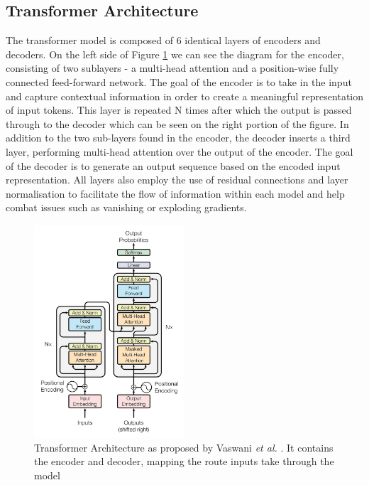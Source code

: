 \subsection{Transformer Architecture}

The transformer model is composed of 6 identical layers of encoders and decoders. On the left side of Figure \ref{fig:transformer_arch} we can see the diagram for the encoder, consisting of two sublayers - a multi-head attention and a position-wise fully connected feed-forward network. The goal of the encoder is to take in the input and capture contextual information in order to create a meaningful representation of input tokens. This layer is repeated N times after which the output is passed through to the decoder which can be seen on the right portion of the figure. In addition to the two sub-layers found in the encoder, the decoder inserts a third layer, performing multi-head attention over the output of the encoder. The goal of the decoder is to generate an output sequence based on the encoded input representation. All layers also employ the use of residual connections and layer normalisation to facilitate the flow of information within each model and help combat issues such as vanishing or exploding gradients.

\begin{figure}[H]
    \centering
    \includegraphics[width=0.5\textwidth]{graphs/transformer_architecture.png}
    \caption{Transformer Architecture as proposed by Vaswani \textit{et al.} \cite{transformer_paper}. It contains the encoder and decoder, mapping the route inputs take through the model}
    \label{fig:transformer_arch}
\end{figure}

